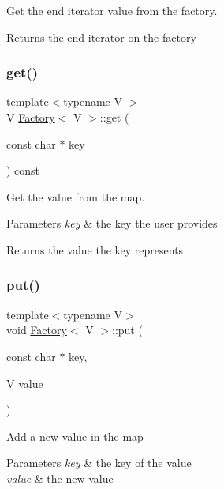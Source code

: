 Get the end iterator value from the factory.

\begin{DoxyReturn}{Returns}
the end iterator on the factory 
\end{DoxyReturn}
\mbox{\label{classFactory_a8a13e5edc3e0c102a1e2fb85047e99d8}} 
\subsubsection{\texorpdfstring{get()}{get()}}
{\footnotesize\ttfamily template$<$typename V $>$ \\
V \mbox{\hyperlink{classFactory}{Factory}}$<$ V $>$\+::get (\begin{DoxyParamCaption}\item[{const char $\ast$}]{key }\end{DoxyParamCaption}) const}

Get the value from the map.


\begin{DoxyParams}{Parameters}
{\em key} & the key the user provides \\
\hline
\end{DoxyParams}
\begin{DoxyReturn}{Returns}
the value the key represents 
\end{DoxyReturn}
\mbox{\label{classFactory_adeaad06fb30141096cc92f98cc3dffa1}} 
\subsubsection{\texorpdfstring{put()}{put()}}
{\footnotesize\ttfamily template$<$typename V$>$ \\
void \mbox{\hyperlink{classFactory}{Factory}}$<$ V $>$\+::put (\begin{DoxyParamCaption}\item[{const char $\ast$}]{key,  }\item[{V}]{value }\end{DoxyParamCaption})}

Add a new value in the map


\begin{DoxyParams}{Parameters}
{\em key} & the key of the value \\
\hline
{\em value} & the new value \\
\hline
\end{DoxyParams}
\mbox{\label{classFactory_a3bb49eea6ec1a75fbe7a8c601f27917d}} 
